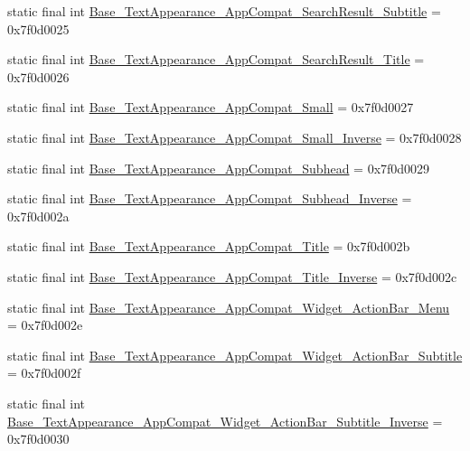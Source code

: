 \begin{DoxyCompactItemize}
static final int \mbox{\hyperlink{classcom_1_1google_1_1android_1_1gms_1_1R_1_1style_a44ac7ba479fb6c0ac302b8d57e106e7e}{Base\+\_\+\+Text\+Appearance\+\_\+\+App\+Compat\+\_\+\+Search\+Result\+\_\+\+Subtitle}} = 0x7f0d0025
\item 
static final int \mbox{\hyperlink{classcom_1_1google_1_1android_1_1gms_1_1R_1_1style_a0a653b5e4594f5a71b7061c37cdd776f}{Base\+\_\+\+Text\+Appearance\+\_\+\+App\+Compat\+\_\+\+Search\+Result\+\_\+\+Title}} = 0x7f0d0026
\item 
static final int \mbox{\hyperlink{classcom_1_1google_1_1android_1_1gms_1_1R_1_1style_aec1cfc7dfd619625ee742eaf2f638610}{Base\+\_\+\+Text\+Appearance\+\_\+\+App\+Compat\+\_\+\+Small}} = 0x7f0d0027
\item 
static final int \mbox{\hyperlink{classcom_1_1google_1_1android_1_1gms_1_1R_1_1style_a6cc5a4e66ebbf386e64689c5930580da}{Base\+\_\+\+Text\+Appearance\+\_\+\+App\+Compat\+\_\+\+Small\+\_\+\+Inverse}} = 0x7f0d0028
\item 
static final int \mbox{\hyperlink{classcom_1_1google_1_1android_1_1gms_1_1R_1_1style_a7e8aee03c27fd141f0e805599d27e73b}{Base\+\_\+\+Text\+Appearance\+\_\+\+App\+Compat\+\_\+\+Subhead}} = 0x7f0d0029
\item 
static final int \mbox{\hyperlink{classcom_1_1google_1_1android_1_1gms_1_1R_1_1style_ab37c602734d2f7b0b82e03bc90f668b8}{Base\+\_\+\+Text\+Appearance\+\_\+\+App\+Compat\+\_\+\+Subhead\+\_\+\+Inverse}} = 0x7f0d002a
\item 
static final int \mbox{\hyperlink{classcom_1_1google_1_1android_1_1gms_1_1R_1_1style_a58a04435933915c1f694e36b17c42894}{Base\+\_\+\+Text\+Appearance\+\_\+\+App\+Compat\+\_\+\+Title}} = 0x7f0d002b
\item 
static final int \mbox{\hyperlink{classcom_1_1google_1_1android_1_1gms_1_1R_1_1style_af8b9c3b389e75a3e70596d4e0c40a479}{Base\+\_\+\+Text\+Appearance\+\_\+\+App\+Compat\+\_\+\+Title\+\_\+\+Inverse}} = 0x7f0d002c
\item 
static final int \mbox{\hyperlink{classcom_1_1google_1_1android_1_1gms_1_1R_1_1style_a25eaf85bb9ec42e0f615b5bfbcb54402}{Base\+\_\+\+Text\+Appearance\+\_\+\+App\+Compat\+\_\+\+Widget\+\_\+\+Action\+Bar\+\_\+\+Menu}} = 0x7f0d002e
\item 
static final int \mbox{\hyperlink{classcom_1_1google_1_1android_1_1gms_1_1R_1_1style_ab1af5135b0fdd29a17b176c670369548}{Base\+\_\+\+Text\+Appearance\+\_\+\+App\+Compat\+\_\+\+Widget\+\_\+\+Action\+Bar\+\_\+\+Subtitle}} = 0x7f0d002f
\item 
static final int \mbox{\hyperlink{classcom_1_1google_1_1android_1_1gms_1_1R_1_1style_a02b81c732476f6dbc0bd2b134b4fd696}{Base\+\_\+\+Text\+Appearance\+\_\+\+App\+Compat\+\_\+\+Widget\+\_\+\+Action\+Bar\+\_\+\+Subtitle\+\_\+\+Inverse}} = 0x7f0d0030

\end{DoxyCompactItemize}
